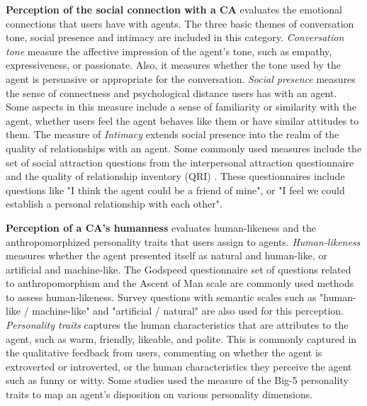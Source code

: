\documentclass[sigconf,screen,review, anonymous]{acmart}
\newcommand{\cmt}[1]{}%
\begin{document}
\textbf{Perception of the social connection with a CA} evaluates the emotional connections that users have with agents. The three basic themes of conversation tone, social presence and intimacy are included in this category. \textit{Conversation tone} measure the affective impression of the agent's tone, such as empathy, expressiveness, or passionate. Also, it measures whether the tone used by the agent is persuasive or appropriate for the conversation. \textit{Social presence} measures the sense of connectness and psychological distance users has with an agent. Some aspects in this measure include a sense of familiarity or similarity with the agent, whether users feel the agent behaves like them or have similar attitudes to them. The measure of \textit{Intimacy} extends social presence into the realm of the quality of relationships with an agent. Some commonly used measures include the set of social attraction questions from the interpersonal attraction questionnaire \cite{mccroskey1975development} and the quality of relationship inventory (QRI) \cite{pierce1997assessing}. These questionnaires include questions like "I think the agent could be a friend of mine", or "I feel we could establish a personal relationship with each other".

\textbf{Perception of a CA's humanness} evaluates human-likeness and the anthropomorphized personality traits that users assign to agents. \textit{Human-likeness} measures whether the agent presented itself as natural and human-like, or artificial and machine-like. The Godspeed questionnaire \cite{bartneck2009measurement}\cmt{godspeed} set of questions related to anthropomorphism and the Ascent of Man scale \cite{kteily2015ascent} are commonly used methods to assess human-likeness. Survey questions with semantic scales such as "human-like / machine-like" and "artificial / natural" are also used for this perception. \textit{Personality traits} captures the human characteristics that are attributes to the agent, such as warm, friendly, likeable, and polite. This is commonly captured in the qualitative feedback from users, commenting on whether the agent is extroverted or introverted, or the human characteristics they perceive the agent such as funny or witty. Some studies used the measure of the Big-5 personality traits \cite{gosling2003very} to map an agent's disposition on various personality dimensions.
\end{document}
